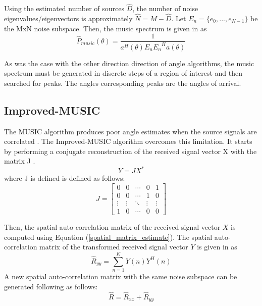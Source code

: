 \documentclass[conference]{IEEEtran}
\begin{document}
		Using the estimated number of sources $\hat{D}$, the number of noise eigenvalues/eigenvectors is approximately $\hat{N} = M - \hat{D}$. Let $E_n = \{e_0,...,e_{N-1}\}$ be the MxN noise subspace. Then, the music spectrum is given in \cite{doa_algorithms_raghu} as
	\begin{equation}
		\label{music_spectrum}
		\hat{P}_{music}(\theta) = \frac{1}{a^H(\theta)E_n{E_n}^Ha(\theta)}
	\end{equation}
	
		As was the case with the other direction direction of angle algorithms, the music spectrum must be generated in discrete steps of a region of interest and then searched for peaks. The angles corresponding peaks are the angles of arrival.
		
	\subsection{Improved-MUSIC}
	
		The MUSIC algorithm produces poor angle estimates when the source signals are correlated \cite{doa_algorithms_raghu}. The Improved-MUSIC algorithm overcomes this limitation. It starts by performing a conjugate reconstruction of the received signal vector X with the matrix J \cite{doa_algorithms_raghu}.
		\begin{equation}
			Y = JX^{*}
		\end{equation}
		where J is defined is defined as follows:
		\begin{equation}
			J = \begin{bmatrix}
				0 & 0 & \cdots & 0 & 1\\
				0 & 0 & \cdots & 1 & 0\\
				\vdots & \vdots & \ddots & \vdots & \vdots\\
				1 & 0 & \cdots & 0 & 0
			\end{bmatrix}
		\end{equation}
		
		Then, the spatial auto-correlation matrix of the received signal vector $X$ is computed using Equation (\ref{spatial_matrix_estimate}). The spatial auto-correlation matrix of the transformed received signal vector $Y$ is given in \cite{doa_algorithms_raghu} as
		\begin{equation}
			\hat{R}_{yy} = \sum_{n=1}^{K}{Y(n)Y^H(n)}
		\end{equation}
		A new spatial auto-correlation matrix with the same noise subspace can be generated following \cite{doa_algorithms_raghu} as follows:
		\begin{equation}
			\hat{R} = \hat{R}_{xx} + \hat{R}_{yy}
		\end{equation} 
		
\end{document}
